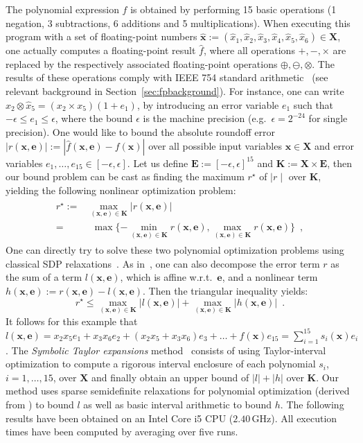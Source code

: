 \documentclass[preprint,fleqn,nocopyrightspace]{sigplanconf}
\newcommand{\x}{\mathbf{x}}
\newcommand{\e}{\mathbf{e}}
\def\E{\mathbf{E}}
\def\K{\mathbf{K}}
\def\X{\mathbf{X}}
\theoremstyle{plain}
\begin{document}
The polynomial expression $f$ is obtained by performing 15 basic operations (1 negation, 3 subtractions, 6 additions and 5 multiplications). 
When executing this program with a set of floating-point numbers $\hat{\x} :=  (\hat{x}_1, \hat{x}_2, \hat{x}_3, \hat{x}_4, \hat{x}_5, \hat{x}_6) \in \X$, one actually computes a floating-point result $\hat{f}$, where all operations $+, -, \times$ are replaced by the respectively associated floating-point operations $\oplus, \ominus, \otimes$. 
The results of these operations comply with IEEE 754 standard arithmetic~\cite{IEEE} (see relevant background in Section~\ref{sec:fpbackground}). For instance, one can write $\hat{x}_2 \otimes \hat{x}_5 =  (x_2 \times x_5) (1 + e_1)$, by introducing an error variable $e_1$ such that $-\epsilon \leq e_1 \leq \epsilon$, where the bound $\epsilon$ is the machine precision (e.g.~$\epsilon = 2^{-24}$ for single precision). One would like to bound the absolute roundoff error $|r(\x, \e)| := | \hat{f}(\x, \e) - f (\x) |$ over  all possible input variables $\x \in \X$ and error variables $e_1, \dots, e_{15} \in [-\epsilon, \epsilon]$. Let us define $\E := [-\epsilon, \epsilon]^{15}$ and $\K := \X \times \E$, then our bound problem can be cast as finding the maximum $r^\star$ of $\mid r \mid$ over $\K$, yielding the following nonlinear optimization problem:
%
\begin{align}
\begin{split}
\label{eq:roptim}
r^\star := & \max_{(\x, \e) \in \K} | r(\x, \e) | \\
 = & \ \ \max \{-\min_{(\x, \e) \in \K} r(\x, \e), \max_{(\x, \e) \in \K} r(\x,\e)\} \enspace,
\end{split}
\end{align}
%
One can directly try to solve these two polynomial optimization problems using classical SDP relaxations~\cite{Lasserre01moments}.
As in~\cite{fptaylor15}, one can also decompose the error term $r$ as the sum of a term $l(\x,\e)$, which is affine w.r.t.~$\e$, and a nonlinear term $h(\x,\e) := r(\x,\e) - l(\x,\e)$. Then the triangular inequality yields:
%
\begin{equation}
\label{eq:lhoptim} 
r^\star \leq \max_{(\x, \e) \in \K} |l(\x, \e)| + \max_{(\x, \e) \in \K} |h(\x, \e)| \enspace. 
\end{equation}
%
It follows for this example that $l(\x,\e) = x_2 x_5 e_1 + x_3 x_6 e_2 +  (x_2 x_5 + x_3 x_6) e_3 + \dots + f(\x) e_{15} = \sum_{i=1}^{15} s_i(\x) e_i$. The {\em Symbolic Taylor expansions} method~\cite{fptaylor15} consists of using Taylor-interval optimization to compute a rigorous interval enclosure of each polynomial $s_i$, $i = 1,\dots,15$, over $\X$ and finally obtain an upper bound of $|l| + |h|$ over $\K$. Our method uses sparse semidefinite relaxations for polynomial optimization (derived from \cite{Las06SparseSOS}) to bound $l$ as well as basic interval arithmetic to bound $h$. The following results have been obtained on an Intel Core i5 CPU ($2.40\, $GHz). All execution times have been computed by averaging over five runs.
\end{document}
